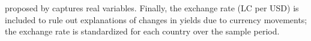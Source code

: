 {proposed by \cite{Hamilton:2019} captures real variables. %
Finally, the exchange rate (LC per USD) is included to rule out explanations of changes in yields due to currency movements; the exchange rate is standardized for each country over the sample period.

}
